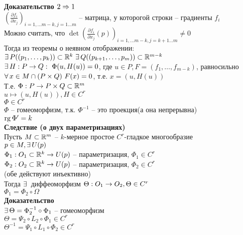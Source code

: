 \documentclass[12pt]{article}
\newcommand{\ppart}[2]{\frac{\partial #1}{\partial #2}}
\begin{document}
\textbf{Доказательство $2 \Rightarrow 1$}\\
$(\ppart{f_i}{x_j})_{i=1,\ldots m-k, j=1\ldots m}$ -- матрица, у которогой строки -- градиенты $f_i$\\
Можно считать, что $\det(\ppart{f_i}{x_j}(p))_{i=1,\ldots m-k, j={k+1}\ldots m} \neq 0$\\
Тогда из теоремы о неявном отображении:\\
$\exists\, P((p_1,\ldots, p_k)) \subset \mathbb{R}^k\ \exists\, Q((p_{k+1}, \ldots, p_m))\subset \mathbb{R}^{m-k}$\\
$\exists\, H: P \rightarrow Q:\ \Phi(u, H(u)) = 0$, где $u \in P, F=(f_1,\ldots, f_{m-k})$, равносильно $\fall x \in M\cap (P\times Q)\ F(x)=0$, т.е. $x=(u, H(u))$\\
Т.е. $\Phi: P\rightarrow P\times Q \subset \mathbb{R}^m$\\
$u\mapsto (u, H(u)), H\in C^r$\\
$\Phi \in C^r$\\
$\Phi$ -- гомеоморфизм, т.к. $\Phi^{-1}$ -- это проекция(а она непрерывна)\\
$\operatorname{rg} \Phi' = k$\\
\textbf{Следствие (о двух параметризациях)}\\
Пусть $M \subset \mathbb{R}^m$ -- $k$-мерное простое $C^r$-гладкое многообразие\\
$p\in M, \exists\, U(p)$\\
$\Phi_1: O_1\subset \mathbb{R}^k \rightarrow U(p)$ -- параметризация, $\Phi_1 \in C^r$\\
$\Phi_2: O_2\subset \mathbb{R}^k \rightarrow U(p)$ -- параметризация, $\Phi_2 \in C^r$\\
(обе действуют инъективно)\\
Тогда $\exists\,$ диффеоморфизм $\Theta: O_1 \rightarrow O_2, \Theta \in C^r$\\
$\Phi_1 = \Phi_2\circ \Omega$\\
\textbf{Доказательство}\\
$\exists\, \Theta = \Phi_2^{-1}\circ \Phi_1$ -- гомеоморфизм\\
$\Theta=\Psi_2\circ L_2\circ \Phi_1\in C^r$\\
$\Theta^{-1} = \Psi_1 \circ L_1 \circ \Phi_2 \in C^r$\\
\end{document}

